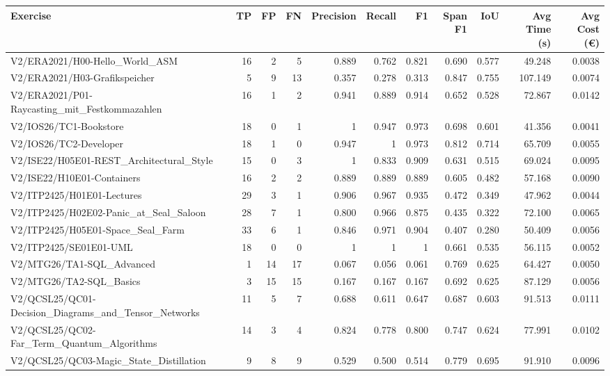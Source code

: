 \begin{tabular}{lrrrrrrrrrr}
Exercise & TP & FP & FN & Precision & Recall & F1 & Span F1 & IoU & Avg Time (s) & Avg Cost (€) \\
\hline
V2/ERA2021/H00-Hello\_World\_ASM & 16 & 2 & 5 & 0.889 & 0.762 & 0.821 & 0.690 & 0.577 & 49.248 & 0.0038 \\
V2/ERA2021/H03-Grafikspeicher & 5 & 9 & 13 & 0.357 & 0.278 & 0.313 & 0.847 & 0.755 & 107.149 & 0.0074 \\
V2/ERA2021/P01-Raycasting\_mit\_Festkommazahlen & 16 & 1 & 2 & 0.941 & 0.889 & 0.914 & 0.652 & 0.528 & 72.867 & 0.0142 \\
V2/IOS26/TC1-Bookstore & 18 & 0 & 1 & 1 & 0.947 & 0.973 & 0.698 & 0.601 & 41.356 & 0.0041 \\
V2/IOS26/TC2-Developer & 18 & 1 & 0 & 0.947 & 1 & 0.973 & 0.812 & 0.714 & 65.709 & 0.0055 \\
V2/ISE22/H05E01-REST\_Architectural\_Style & 15 & 0 & 3 & 1 & 0.833 & 0.909 & 0.631 & 0.515 & 69.024 & 0.0095 \\
V2/ISE22/H10E01-Containers & 16 & 2 & 2 & 0.889 & 0.889 & 0.889 & 0.605 & 0.482 & 57.168 & 0.0090 \\
V2/ITP2425/H01E01-Lectures & 29 & 3 & 1 & 0.906 & 0.967 & 0.935 & 0.472 & 0.349 & 47.962 & 0.0044 \\
V2/ITP2425/H02E02-Panic\_at\_Seal\_Saloon & 28 & 7 & 1 & 0.800 & 0.966 & 0.875 & 0.435 & 0.322 & 72.100 & 0.0065 \\
V2/ITP2425/H05E01-Space\_Seal\_Farm & 33 & 6 & 1 & 0.846 & 0.971 & 0.904 & 0.407 & 0.280 & 50.409 & 0.0056 \\
V2/ITP2425/SE01E01-UML & 18 & 0 & 0 & 1 & 1 & 1 & 0.661 & 0.535 & 56.115 & 0.0052 \\
V2/MTG26/TA1-SQL\_Advanced & 1 & 14 & 17 & 0.067 & 0.056 & 0.061 & 0.769 & 0.625 & 64.427 & 0.0050 \\
V2/MTG26/TA2-SQL\_Basics & 3 & 15 & 15 & 0.167 & 0.167 & 0.167 & 0.692 & 0.625 & 87.129 & 0.0056 \\
V2/QCSL25/QC01-Decision\_Diagrams\_and\_Tensor\_Networks & 11 & 5 & 7 & 0.688 & 0.611 & 0.647 & 0.687 & 0.603 & 91.513 & 0.0111 \\
V2/QCSL25/QC02-Far\_Term\_Quantum\_Algorithms & 14 & 3 & 4 & 0.824 & 0.778 & 0.800 & 0.747 & 0.624 & 77.991 & 0.0102 \\
V2/QCSL25/QC03-Magic\_State\_Distillation & 9 & 8 & 9 & 0.529 & 0.500 & 0.514 & 0.779 & 0.695 & 91.910 & 0.0096 \\
\end{tabular}
